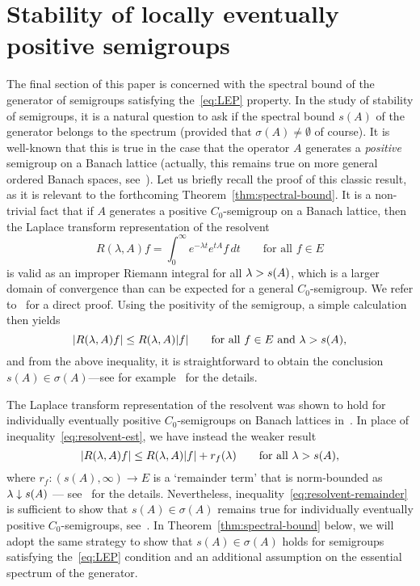 \documentclass[a4paper, reqno]{amsart}
\numberwithin{equation}{section}
\theoremstyle{plain}
\theoremstyle{definition}
\theoremstyle{remark}
\let\Re\relax
\DeclareMathOperator{\Re}{Re}
\begin{document}
\section{Stability of locally eventually positive semigroups}
\label{sec:stability}

The final section of this paper is concerned with the spectral bound of the generator of semigroups satisfying the~\eqref{eq:LEP} property. In the study of stability of semigroups, it is a natural question to ask if the spectral bound $s(A)$ of the generator belongs to the spectrum (provided that $\sigma(A)\ne\emptyset$ of course). It is well-known that this is true in the case that the operator $A$ generates a \emph{positive} semigroup on a Banach lattice (actually, this remains true on more general ordered Banach spaces, see~\cite[Theorem 5.3.1]{ABHN}). Let us briefly recall the proof of this classic result, as it is relevant to the forthcoming Theorem~\ref{thm:spectral-bound}. It is a non-trivial fact that if $A$ generates a positive $C_0$-semigroup on a Banach lattice, then the Laplace transform representation of the resolvent
\begin{equation*}
	R(\lambda,A)f = \int_0^\infty e^{-\lambda t}e^{tA}f \,dt \qquad\text{for all }f\in E
\end{equation*}
is valid as an improper Riemann integral for all $\Re\lambda >s(A)$, which is a larger domain of convergence than can be expected for a general $C_0$-semigroup. We refer to~\cite[Theorem 12.7]{BFR} for a direct proof. Using the positivity of the semigroup, a simple calculation then yields
\begin{equation}
\label{eq:resolvent-est}
	|R(\lambda,A)f| \le R(\Re\lambda,A)|f| \qquad\text{for all }f\in E\text{ and }\Re\lambda >s(A),
\end{equation}
and from the above inequality, it is straightforward to obtain the conclusion $s(A)\in\sigma(A)$---see for example~\cite[Corollary 12.9]{BFR} for the details.

The Laplace transform representation of the resolvent was shown to hold for individually eventually positive $C_0$-semigroups on Banach lattices in~\cite[Proposition 7.1]{DGK1}. In place of inequality~\eqref{eq:resolvent-est}, we have instead the weaker result
\begin{equation}
	\label{eq:resolvent-remainder}
	|R(\lambda,A)f| \le R(\Re\lambda,A)|f| + r_f(\Re\lambda) \qquad\text{for all }\Re\lambda >s(A),
\end{equation}
where $r_f : (s(A),\infty) \to E$ is a `remainder term' that is norm-bounded as $\Re\lambda\downarrow s(A)$ --- see~\cite[Lemma 7.4]{DGK1} for the details. Nevertheless, inequality~\eqref{eq:resolvent-remainder} is sufficient to show that $s(A)\in\sigma(A)$ remains true for individually eventually positive $C_0$-semigroups, see~\cite[Theorem 7.6]{DGK1}. In Theorem~\ref{thm:spectral-bound} below, we will adopt the same strategy to show that $s(A)\in\sigma(A)$ holds for semigroups satisfying the~\eqref{eq:LEP} condition and an additional assumption on the essential spectrum of the generator.
\end{document}
